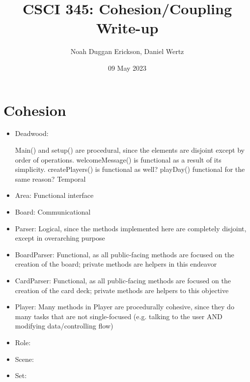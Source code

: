\documentclass[letterpaper, twoside]{report}
\title{CSCI 345: Cohesion/Coupling Write-up}
\author{Noah Duggan Erickson, Daniel Wertz}
\date{09 May 2023}
\begin{document}
\maketitle

\chapter{Cohesion}
\begin{itemize}
    \item Deadwood:

    Main() and setup() are procedural, since the elements are disjoint except by order of operations. welcomeMessage() is functional as a result of its simplicity. createPlayers() is functional as well? playDay() functional for the same reason?
    Temporal 
    \item Area: Functional interface
    \item Board: Communicational
    \item Parser: Logical, since the methods implemented here are completely disjoint, except in overarching purpose
    \item BoardParser: Functional, as all public-facing methods are focused on the creation of the board; private methods are helpers in this endeavor
    \item CardParser: Functional, as all public-facing methods are focused on the creation of the card deck; private methods are helpers to this objective
    \item Player: Many methods in Player are procedurally cohesive, since they do many tasks that are not single-focused (e.g. talking to the user AND modifying data/controlling flow)
    \item Role:
    \item Scene:
    \item Set:
\end{itemize}
\end{document}

